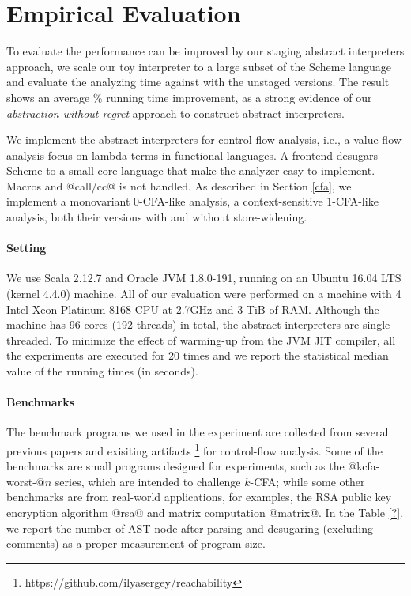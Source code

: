 \section{Empirical Evaluation} \label{evaluation}

To evaluate the performance can be improved by our staging abstract interpreters
approach, we scale our toy interpreter to a large subset of the Scheme language
and evaluate the analyzing time against with the unstaged versions. The result
shows an average \% running time improvement, as a strong evidence of
our \textit{abstraction without regret} approach to construct abstract
interpreters.

We implement the abstract interpreters for control-flow analysis, i.e., a
value-flow analysis focus on lambda terms in functional languages. A frontend
desugars Scheme to a small core language that make the analyzer easy to
implement. Macros and @call/cc@ is not handled. As described in Section
\ref{cfa}, we implement a monovariant 0-CFA-like analysis, a context-sensitive
$1$-CFA-like analysis, both their versions with and without store-widening.

\paragraph{Setting}
We use Scala 2.12.7 and Oracle JVM 1.8.0-191, running on an Ubuntu 16.04 LTS
(kernel 4.4.0) machine. All of our evaluation were performed on a machine with 4 Intel
Xeon Platinum 8168 CPU at 2.7GHz and 3 TiB of RAM. Although the machine has 96
cores (192 threads) in total, the abstract interpreters are single-threaded.
To minimize the effect of warming-up from the JVM JIT compiler, all the
experiments are executed for 20 times and we report the statistical median value
of the running times (in seconds).

\paragraph{Benchmarks}
The benchmark programs we used in the experiment are collected from several previous papers
\cite{Johnson:2013:OAA:2500365.2500604, ashley:practical,
DBLP:journals/corr/abs-1102-3676} and exisiting artifacts
\footnote{https://github.com/ilyasergey/reachability} for control-flow analysis.
Some of the benchmarks are small programs designed for experiments, such as the @kcfa-worst-@$n$ series, 
which are intended to challenge $k$-CFA; while some other benchmarks are from real-world applications, 
for examples, the RSA public key encryption algorithm @rsa@ and matrix computation @matrix@.
In the Table \ref{?}, we report the number of AST node after parsing and desugaring 
(excluding comments) as a proper measurement of program size.

